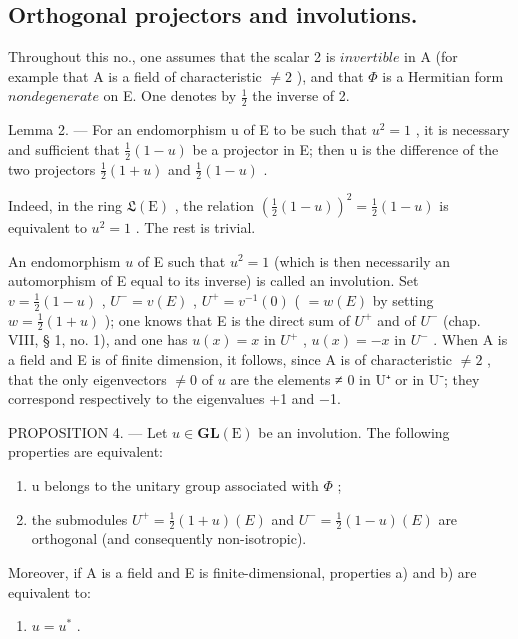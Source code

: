 \subsection{Orthogonal projectors and involutions.}

Throughout this no., one assumes that the scalar 2 is \(invertible\) in A (for example that A is a field of characteristic \(\neq 2\) ), and that \(\Phi\) is a Hermitian form \(nondegenerate\) on E. One denotes by \(\frac{1}{2}\) the inverse of 2.

Lemma 2. --- For an endomorphism u of E to be such that \(u^{2}=1\) , it is necessary and sufficient that \(\frac{1}{2}(1-u)\) be a projector in E; then u is the difference of the two projectors \(\frac{1}{2}(1+u)\) and \(\frac{1}{2}(1-u)\) .

Indeed, in the ring \(\mathfrak{L}(\mathrm{E})\) , the relation \(\left(\frac{1}{2}(1 - u)\right)^2 = \frac{1}{2}(1 - u)\) is equivalent to \(u^2 = 1\) . The rest is trivial.

An endomorphism \(u\) of E such that \(u^2 = 1\) (which is then necessarily an automorphism of E equal to its inverse) is called an involution. Set \(v = \frac{1}{2}(1 - u)\) , \(U^- = v(E)\) , \(U^+ = v^{-1}(0)\) ( \(= w(E)\) by setting \(w = \frac{1}{2}(1 + u)\) ); one knows that E is the direct sum of \(U^+\) and of \(U^-\) (chap. VIII, § 1, no. 1), and one has \(u(x) = x\) in \(U^+\) , \(u(x) = -x\) in \(U^-\) . When A is a field and E is of finite dimension, it follows, since A is of characteristic \(\neq 2\) , that the only eigenvectors \(\neq 0\) of \(u\) are the elements ≠ 0 in U⁺ or in U⁻; they correspond respectively to the eigenvalues +1 and −1.

PROPOSITION 4. --- Let \(u \in \mathbf{GL}(\mathrm{E})\) be an involution. The following properties are equivalent:

\begin{enumerate}
\def\labelenumi{\alph{enumi})}
\item
  u belongs to the unitary group associated with \(\Phi\) ;
\item
  the submodules \(U^{+} = \frac{1}{2}(1 + u)(E)\) and \(U^{-} = \frac{1}{2}(1 - u)(E)\) are orthogonal (and consequently non-isotropic).
\end{enumerate}

Moreover, if A is a field and E is finite-dimensional, properties a) and b) are equivalent to:

\begin{enumerate}
\def\labelenumi{\alph{enumi})}
\setcounter{enumi}{2}
\tightlist
\item
  \(u = u^{*}\) .
\end{enumerate}

